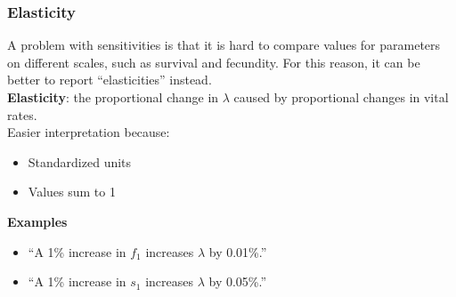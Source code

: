 \documentclass[color=usenames,dvipsnames]{beamer}\usepackage[]{graphicx}\usepackage[]{color}
\begin{document}
\begin{frame}
  \frametitle{Elasticity}
  A problem with sensitivities is that it is hard to compare values
  for parameters on different scales, such as survival and
  fecundity. For this reason, it can be better to report
  ``elasticities'' instead. \\
  \pause
  \vfill
  {\bf Elasticity}: the proportional change in $\lambda$ caused by
  proportional changes in vital rates. \\
  \pause
  \vfill
   Easier interpretation because: %
   \begin{itemize}
     \item Standardized units
     \item Values sum to 1
   \end{itemize}
   \pause
   \vfill
   {\bf Examples}
  \begin{itemize}
    \item[] ``A 1\% increase in $f_1$ increases $\lambda$ by 0.01\%.''
    \item[] ``A 1\% increase in $s_1$ increases $\lambda$ by 0.05\%.''
  \end{itemize}

\end{frame}
\end{document}
